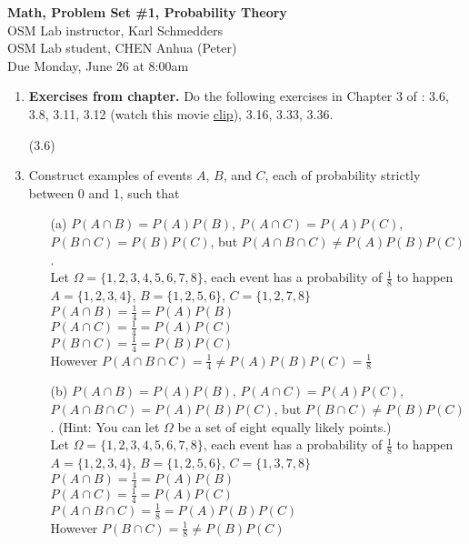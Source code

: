 \documentclass[letterpaper,12pt]{article}
\theoremstyle{definition}
\begin{document}
\begin{flushleft}
   \textbf{\large{Math, Problem Set \#1, Probability Theory}} \\[5pt]
   OSM Lab instructor, Karl Schmedders \\[5pt]
   OSM Lab student, CHEN Anhua (Peter)\\[5pt]
   Due Monday, June 26 at 8:00am
\end{flushleft}

\vspace{5mm}

\begin{enumerate}
	\item {\bf Exercises from chapter.} Do the following exercises in Chapter 3 of \citet{HJ17}: 3.6, 3.8, 3.11, 3.12 (watch this movie \href{https://www.youtube.com/watch?v=Zr_xWfThjJ0}{clip}), 3.16, 3.33, 3.36.
			\item[(3.6)]
			
	\item Construct examples of events $A$, $B$, and $C$, each of probability strictly between 0 and 1, such that
   		\begin{itemize}
			\item[(a)] $P(A  \cap B) = P(A)P(B)$, $P(A  \cap C) = P(A)P(C)$, $P(B  \cap C) = P(B)P(C)$, but $P(A  \cap B \cap C) \neq P(A)P(B)P(C)$.\\
			Let $\Omega = \{ 1, 2, 3, 4, 5, 6, 7, 8\}$, each event has a probability of $\frac{1}{8}$ to happen\\
			$A = \{1, 2, 3, 4\}$,
			$B = \{1, 2, 5, 6\}$,
			$C = \{1, 2, 7, 8\}$\\
			$P(A \cap B) = \frac{1}{4} = P(A)P(B)$\\
			$P(A \cap C) = \frac{1}{4} = P(A)P(C)$\\
			$P(B \cap C) = \frac{1}{4} = P(B)P(C)$\\
			However $P(A\cap B \cap C) = \frac{1}{4}  \neq  P(A) P(B)P(C) = \frac{1}{8}$\\
						
			\item[(b)] $P(A  \cap B) = P(A)P(B)$, $P(A  \cap C) = P(A)P(C)$, $P(A  \cap B \cap C) = P(A)P(B)P(C)$, but $P(B  \cap C) \neq P(B)P(C)$. (Hint: You can let $\Omega$ be a set of eight equally likely points.)\\
			
			Let $\Omega = \{ 1, 2, 3, 4, 5, 6, 7, 8\}$, each event has a probability of $\frac{1}{8}$ to happen\\
			$A = \{1, 2, 3, 4\}$,
			$B = \{1, 2, 5, 6\}$,
			$C = \{1, 3, 7, 8\}$\\
			$P(A \cap B) = \frac{1}{4} = P(A)P(B)$\\
			$P(A \cap C) = \frac{1}{4} = P(A)P(C)$\\
			$P(A \cap B \cap C) = \frac{1}{8} = P(A)P(B)P(C)$\\
			However $P(B \cap C) = \frac{1}{8} \neq P(B)P(C)$\\
			

\end{itemize}
\end{enumerate}
\end{document}
